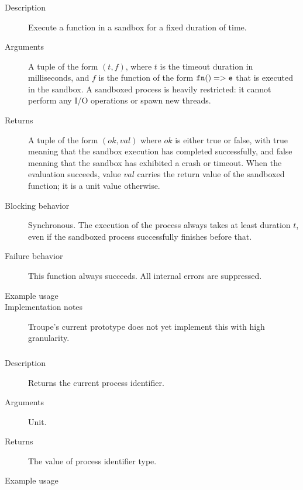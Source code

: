 \subsubsection{} 
\begin{description}
    \item [Description] Execute a function in a sandbox for a fixed duration of time.
    \item [Arguments] A tuple of the form $(\mathit{t}, f)$, where $t$ is the timeout duration in milliseconds, and $f$ is the function
of the form ${\mathtt{fn () => e}}$ that is executed in the sandbox. A sandboxed process is heavily restricted: it cannot perform
any I/O operations or spawn new threads. 
    \item [Returns] A tuple of the form $(\mathit{ok}, \mathit{val})$ where $\mathit{ok}$ is either true or false, with true meaning that the sandbox execution has completed successfully, and false meaning that the sandbox has exhibited a crash or timeout. When the evaluation succeeds, value $\mathit{val}$ carries the return value of the sandboxed function; it is a unit value otherwise.
    \item [Blocking behavior] Synchronous. The execution of the process always takes at least duration $\mathit{t}$, even if the sandboxed process successfully finishes before that.
    \item [Failure behavior] This function always succeeds. All internal errors are suppressed.
    \item [Example usage] 
    \item [Implementation notes] Troupe's current prototype does not yet implement this with high granularity.
\end{description}


\subsubsection{}
\begin{description}
    \item [Description] Returns the current process identifier.
    \item [Arguments] Unit.
    \item [Returns] The value of process identifier type.
    \item [Example usage] 
\end{description}


